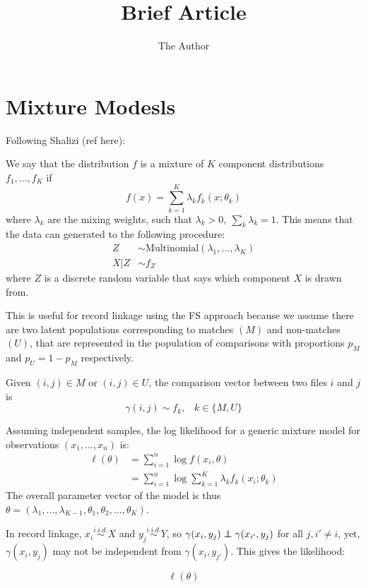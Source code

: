 \documentclass[11pt]{amsart}
\title{Brief Article}
\author{The Author}
\newcommand\independent{\protect\mathpalette{\protect\independenT}{\perp}}
\def\independenT#1#2{\mathrel{\rlap{$#1#2$}\mkern2mu{#1#2}}}
\begin{document}
\maketitle
\section{Mixture Modesls}
Following Shalizi (ref here):  

We say that the distribution $f$ is a mixture of $K$ component distributions $f_1, \dots, f_K$ if 
\[ f(x) = \sum_{k=1}^K \lambda_k f_k(x; \theta_k) \] 
where $\lambda_k$ are the mixing weights, such that $\lambda_k>0, \ \sum_k \lambda_k = 1$.  This means that the data can generated to the following procedure: 
\begin{align*}
Z &\sim \text{Multinomial}(\lambda_1, \dots, \lambda_K) \\
X | Z &\sim f_{Z}
\end{align*}
where $Z$ is a discrete random variable that says which component $X$ is drawn from. 

This is useful for record linkage using the FS approach because we assume there are two latent populations corresponding to matches $(M)$ and non-matches $(U)$, that are represented in the population of comparisons with proportions $p_M$ and $p_U = 1 - p_M$ respectively.  


Given $(i,j) \in M$ or $ (i,j)\in U$, the comparison vector between two files $i$ and $j$ is
\[ \gamma(i,j) \sim f_{k}, \hspace{10pt} k\in\{M,U\} \]


Assuming independent samples, the log likelihood for a generic mixture model for observations $(x_1,\dots, x_n)$ is:
\begin{align} 
\ell(\theta) &= \sum_{i=1}^n \log f(x_i,\theta)  \\
		&= \sum_{i=1}^n \log \sum_{k=1}^K \lambda_k f_k(x_i; \theta_k)  \label{eq:llh}
\end{align}
The overall parameter vector of the model is thus $\theta = (\lambda_1,\dots,\lambda_{K-1}, \theta_1, \theta_2, \dots, \theta_K)$.  

In record linkage, $x_i \overset{i.i.d.}{\sim}X$ and $y_j  \overset{i.i.d.}{\sim} Y$, so $\gamma(x_i, y_j) \independent \gamma(x_{i'}, y_j)$ for all  $j, i'\neq i$, yet, $\gamma(x_i,y_j) $ may not be independent from $\gamma(x_i,y_{j'})$.  This gives the likelihood:


\begin{equation} \ell(\theta) \end{equation}
\end{document}
